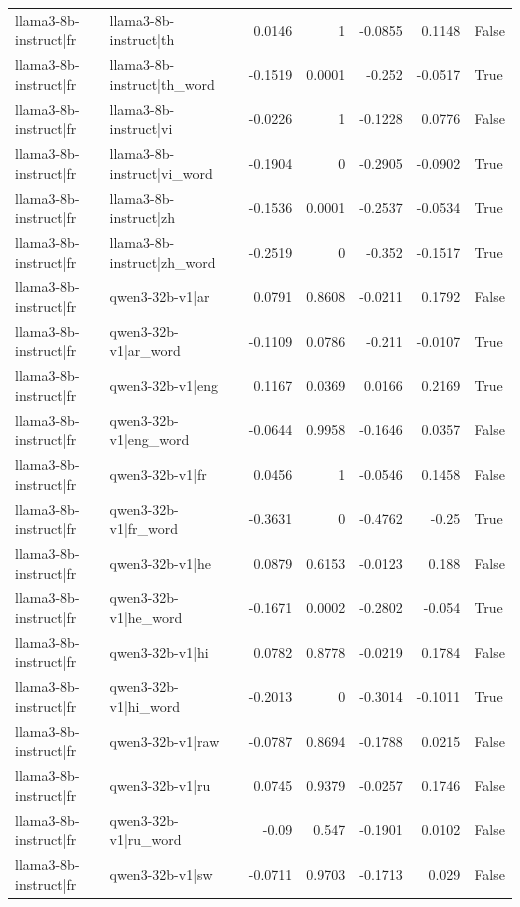 \begin{table}
\begin{tabular}{l l r r r r l}
llama3-8b-instruct|fr & llama3-8b-instruct|th & 0.0146 & 1 & -0.0855 & 0.1148 & False \\
llama3-8b-instruct|fr & llama3-8b-instruct|th_word & -0.1519 & 0.0001 & -0.252 & -0.0517 & True \\
llama3-8b-instruct|fr & llama3-8b-instruct|vi & -0.0226 & 1 & -0.1228 & 0.0776 & False \\
llama3-8b-instruct|fr & llama3-8b-instruct|vi_word & -0.1904 & 0 & -0.2905 & -0.0902 & True \\
llama3-8b-instruct|fr & llama3-8b-instruct|zh & -0.1536 & 0.0001 & -0.2537 & -0.0534 & True \\
llama3-8b-instruct|fr & llama3-8b-instruct|zh_word & -0.2519 & 0 & -0.352 & -0.1517 & True \\
llama3-8b-instruct|fr & qwen3-32b-v1|ar & 0.0791 & 0.8608 & -0.0211 & 0.1792 & False \\
llama3-8b-instruct|fr & qwen3-32b-v1|ar_word & -0.1109 & 0.0786 & -0.211 & -0.0107 & True \\
llama3-8b-instruct|fr & qwen3-32b-v1|eng & 0.1167 & 0.0369 & 0.0166 & 0.2169 & True \\
llama3-8b-instruct|fr & qwen3-32b-v1|eng_word & -0.0644 & 0.9958 & -0.1646 & 0.0357 & False \\
llama3-8b-instruct|fr & qwen3-32b-v1|fr & 0.0456 & 1 & -0.0546 & 0.1458 & False \\
llama3-8b-instruct|fr & qwen3-32b-v1|fr_word & -0.3631 & 0 & -0.4762 & -0.25 & True \\
llama3-8b-instruct|fr & qwen3-32b-v1|he & 0.0879 & 0.6153 & -0.0123 & 0.188 & False \\
llama3-8b-instruct|fr & qwen3-32b-v1|he_word & -0.1671 & 0.0002 & -0.2802 & -0.054 & True \\
llama3-8b-instruct|fr & qwen3-32b-v1|hi & 0.0782 & 0.8778 & -0.0219 & 0.1784 & False \\
llama3-8b-instruct|fr & qwen3-32b-v1|hi_word & -0.2013 & 0 & -0.3014 & -0.1011 & True \\
llama3-8b-instruct|fr & qwen3-32b-v1|raw & -0.0787 & 0.8694 & -0.1788 & 0.0215 & False \\
llama3-8b-instruct|fr & qwen3-32b-v1|ru & 0.0745 & 0.9379 & -0.0257 & 0.1746 & False \\
llama3-8b-instruct|fr & qwen3-32b-v1|ru_word & -0.09 & 0.547 & -0.1901 & 0.0102 & False \\
llama3-8b-instruct|fr & qwen3-32b-v1|sw & -0.0711 & 0.9703 & -0.1713 & 0.029 & False \\

\end{tabular}
\end{table}
